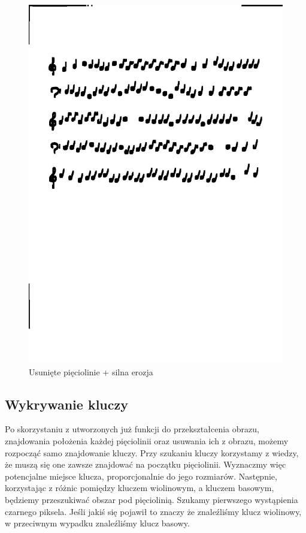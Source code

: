 \documentclass[11pt]{article}
\begin{document}
\begin{figure}[H]
    \centering
    \graphicspath{ {blobs/} }
    \includegraphics[scale=0.15]{4.jpg}
    \caption{Usunięte pięciolinie + silna erozja}
    \label{fig:universe}
    \end{figure}

\subsection{Wykrywanie kluczy}
Po skorzystaniu z utworzonych już funkcji do przekształcenia obrazu, znajdowania położenia każdej pięciolinii oraz usuwania ich z obrazu, możemy rozpocząć samo znajdowanie kluczy.
Przy szukaniu kluczy korzystamy z wiedzy, że muszą się one zawsze znajdować na początku pięciolinii. Wyznaczmy więc potencjalne miejsce klucza, proporcjonalnie do jego rozmiarów.
Następnie, korzystając z różnic pomiędzy kluczem wiolinowym, a kluczem basowym, będziemy przeszukiwać obszar pod pięciolinią. Szukamy pierwszego wystąpienia czarnego piksela. Jeśli jakiś się pojawił to znaczy że znaleźliśmy klucz wiolinowy, w przeciwnym wypadku znaleźliśmy klucz basowy.
\end{document}
